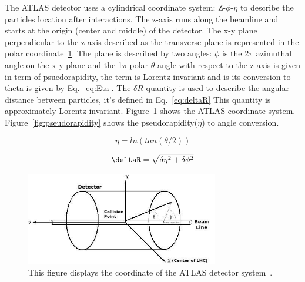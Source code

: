 The ATLAS detector uses a cylindrical coordinate system: Z-$\phi$-$\eta$ to describe the particles location after interactions.
The z-axis runs along the beamline and starts at the origin (center and middle) of the detector. The x-y plane perpendicular to the z-axis described as the transverse plane is represented in the polar coordinate~\ref{fig:Coordinates}. The plane is described by two angles: $\phi$ is the 2$\pi$ azimuthal angle on the x-y plane and the 1$\pi$ polar $\theta$ angle with respect to the z axis is given in term of psuedorapidity, the term is Lorentz invariant and is its conversion to theta is given
by Eq.~\ref{eq:Eta}. The $\delta R$ quantity is used to describe the angular distance between particles, it's defined in Eq.~\ref{eq:deltaR} This quantity is approximately Lorentz invariant. Figure~\ref{fig:Coordinates} shows the ATLAS coordinate system. Figure~\ref{fig:pseudorapidity} shows the pseudorapidity($\eta$) to angle conversion. 

\begin{equation}
    \eta=ln(tan(\theta/2))
    \label{eq:Eta}
\end{equation}

\begin{equation}
\deltaR=\sqrt{\delta\eta^{2}+\delta\phi^{2}} 
\label{eq:deltaR}
\end{equation}

\begin{figure}[!htb]
    \begin{center}
        \includegraphics[width=0.75\textwidth]{figures/chapter_ATLAS/Coordinates}
        \caption{
            This figure displays the coordinate of the ATLAS detector system~\cite{2008}.
        }
        \label{fig:Coordinates}
    \end{center}
\end{figure}

